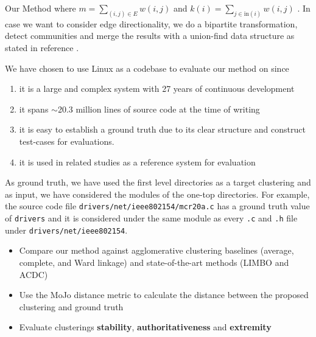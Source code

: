 \documentclass[final]{beamer}
\newlength{\colwidth}
\begin{document}
\begin{frame}[t]
\begin{columns}[t]
\begin{column}{\colwidth}
\begin{alertblock}{Our Method}
where $m = \sum_{(i, j) \in E} w(i,j)$ and $k(i) = \sum_{j \in \mathrm{in}(i)} w(i, j)$ . In case we want to consider edge directionality, we do a bipartite transformation, detect communities and
merge the results with a union-find data structure as stated in reference \cite{malliaros}.



We have chosen to use Linux as a codebase to evaluate our method on since 

\begin{enumerate}

\item it is a large and complex system with 27 years of continuous development 
\item it spans $\sim$20.3 million lines of source code at the time of writing
\item  it is easy to establish a ground truth due to its clear structure and construct test-cases for evaluations. 

\item it is used in related studies \cite{acdc, evaluation} as a reference system for evaluation

\end{enumerate}

As ground truth, we have used the first level directories as a target clustering and as input, we have considered 
the modules of the one-top directories. 
For example, the source code file \texttt{drivers/net/ieee802154\-/mcr20a.c} has a ground truth value of \texttt{drivers} 
and it is considered under the same module as every \texttt{.c} and \texttt{.h} file under \texttt{drivers/net/ieee802154}. 


\begin{itemize}

\item Compare our method against agglomerative clustering baselines (average, complete, and Ward linkage) and state-of-the-art methods (LIMBO and ACDC)
\item Use the MoJo distance metric to calculate the distance between the proposed clustering and ground truth
\item Evaluate clusterings \textbf{stability}, \textbf{authoritativeness} and \textbf{extremity}

\end{itemize}


\end{alertblock}
\end{column}
\end{columns}
\end{frame}
\end{document}
